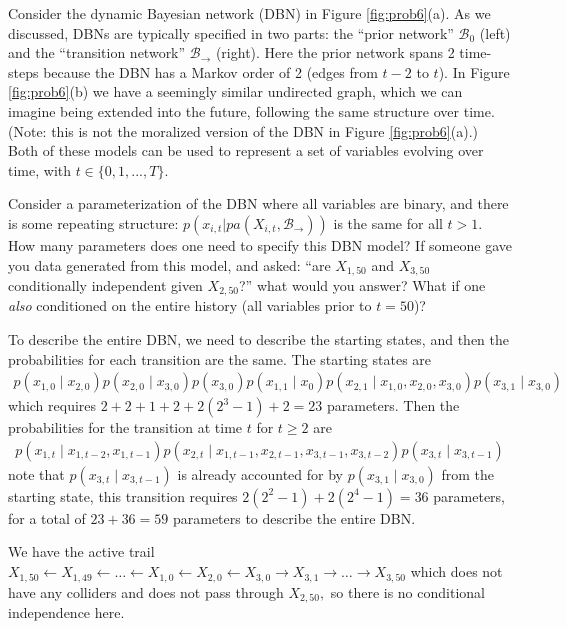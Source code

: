 \documentclass[letterpaper]{article}
\begin{document}
Consider the dynamic Bayesian network (DBN) in Figure \ref{fig:prob6}(a). As we discussed, DBNs are typically specified in two parts: the ``prior network'' $\mathcal{B}_0$ (left) and the ``transition network'' $\mathcal{B}_{\rightarrow}$ (right). Here the prior network spans 2 time-steps because the DBN has a Markov order of 2 (edges from $t-2$ to $t$). In Figure \ref{fig:prob6}(b) we have a seemingly similar undirected graph, which we can imagine being extended into the future, following the same structure over time. (Note: this is not the moralized version of the DBN in Figure \ref{fig:prob6}(a).) Both of these models can be used to represent a set of variables evolving over time, with $t \in \{0,1,...,T\}$.
\begin{enumerate}[a)]
  \ii Consider a parameterization of the DBN where all variables are binary, and there is some repeating structure: $p(x_{i,t}|pa(X_{i,t},\mathcal{B}_{\rightarrow}))$ is the same for all $t>1$. How many parameters does one need to specify this DBN model? If someone gave you data generated from this model, and asked: ``are $X_{1,50}$ and $X_{3,50}$ conditionally independent given $X_{2,50}$?'' what would you answer? What if one \emph{also} conditioned on the entire history (all variables prior to $t=50$)?
  \begin{soln}
    To describe the entire DBN, we need to describe the starting states, and then the probabilities for each transition are the same. The starting states are
    \begin{align*}
      p(x_{1, 0}\mid x_{2, 0}) p(x_{2, 0}\mid x_{3, 0}) p(x_{3, 0}) p(x_{1, 1}\mid x_0) p(x_{2, 1}\mid x_{1, 0}, x_{2, 0}, x_{3, 0}) p(x_{3, 1}\mid x_{3, 0})
    \end{align*}
    which requires $2+2+1+2+2(2^3-1)+2=23$ parameters. Then the probabilities for the transition at time $t$ for $t\ge 2$ are
    \begin{align*}
      p(x_{1, t}\mid x_{1, t-2}, x_{1, t-1}) p(x_{2, t}\mid x_{1, t-1}, x_{2, t-1}, x_{3, t-1}, x_{3, t-2}) p(x_{3, t}\mid x_{3, t-1})
    \end{align*}
    note that $p(x_{3, t}\mid x_{3, t-1})$ is already accounted for by $p(x_{3, 1}\mid x_{3, 0})$ from the starting state, this transition requires $2(2^2-1)+2(2^4-1) = 36$ parameters, for a total of $23+36=59$ parameters to describe the entire DBN.

    We have the active trail $X_{1, 50}\gets X_{1, 49}\gets \dots \gets X_{1, 0}\gets X_{2, 0}\gets X_{3, 0}\to X_{3, 1}\to \dots\to X_{3, 50}$ which does not have any colliders and does not pass through $X_{2, 50},$ so there is no conditional independence here.


\end{soln}
\end{enumerate}
\end{document}

